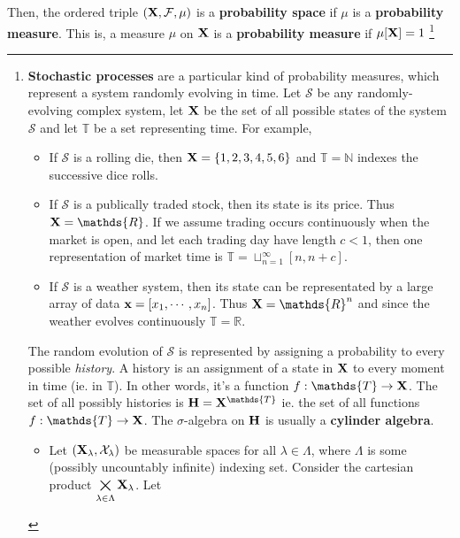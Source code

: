 \documentclass{homework}
\begin{document}
Then, the ordered triple $({\bf X}, \mathcal{F}, \mu)$ is a \textbf{probability space} if $\mu$ is a \textbf{probability measure}. This is, a measure $\mu$ on ${\bf X}$ is a \textbf{probability measure} if $\mu[{\bf X}] = 1$ \footnote{\textbf{Stochastic processes} are a particular kind of probability measures, which represent a system randomly evolving in time. Let $\mathcal{S}$ be any  randomly-evolving complex system, let ${\bf X}$ be the set of all possible states of the system $\mathcal{S}$ and let $\mathds{T}$ be a set representing time. For example, 
    
    \begin{itemize}
        \item If $\mathcal{S}$ is a rolling die, then ${\bf X}= \{1,2,3,4,5,6\}$ and $\mathds{T}=\mathds{N} $ indexes the successive dice rolls. \\
        \item If $\mathcal{S}$ is a publically traded stock, then its state is its price. Thus ${\bf X} = \mathds{R}$. If we assume trading occurs continuously when the market is open, and let each trading day have length $c < 1$, then one representation of market time is $\mathds{T} = \sqcup_{n=1}^{\infty} [n, n+c]$. \\
        \item If $\mathcal{S}$ is a weather system, then its state can be representated by a large array of data ${\bf x} = [x_1,\cdots,x_n]$. Thus ${\bf X} = \mathds{R}^n$ and since the weather evolves continuously $\mathds{T}= \mathds{R}$.\\
    \end{itemize}
    
    The random evolution of $\mathcal{S}$ is represented by assigning a probability to every possible \textit{history}. A history is an assignment of a state in ${\bf X}$ to every moment in time (ie. in $\mathds{T}$). In other words, it's a function $f: \mathds{T} \rightarrow {\bf X}$. The set of all possibly histories is ${\bf H} = {\bf X}^{\mathds{T}}$ ie. the set of all functions $f: \mathds{T} \rightarrow {\bf X}$. The $\sigma$-algebra on ${\bf H}$ is usually a \textbf{cylinder algebra}. 
    
    \begin{itemize}
        \item Let $({\bf X}_\lambda, \mathcal{X}_\lambda)$ be measurable spaces for all $\lambda \in \Lambda$, where $\Lambda$ is some (possibly uncountably infinite) indexing set. Consider the cartesian product  $\bigtimes\limits_{\lambda \in \Lambda}{\bf X}_\lambda$. Let 
        

\end{itemize}}
\end{document}
